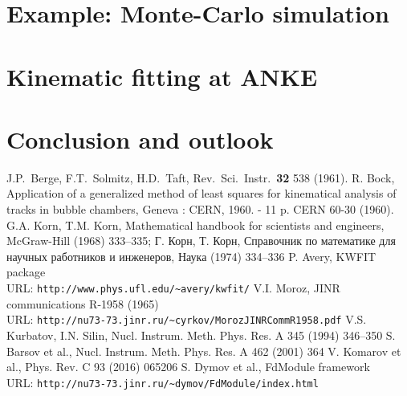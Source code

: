 \documentclass{webofc}
\begin{document}
\section{Example: Monte-Carlo simulation}

\section{Kinematic fitting at ANKE}

\section{Conclusion and outlook}


\begin{thebibliography}{00}
 J.P.~Berge, F.T.~Solmitz, H.D.~Taft, Rev.\ Sci.\ Instr.\ \textbf{32} 538 (1961).
 R. Bock, Application of a generalized method of least squares for kinematical analysis of tracks in bubble chambers,       Geneva : CERN, 1960. - 11 p. CERN 60-30 (1960).
 G.A. Korn, T.M. Korn, Mathematical handbook for scientists and engineers, McGraw-Hill (1968) 333--335; \foreignlanguage{russian}{Г. Корн, Т. Корн, Справочник по математике для научных работников и инженеров, Наука (1974) 334--336}
 P. Avery, KWFIT package\\ URL: \texttt{http://www.phys.ufl.edu/\textasciitilde{}avery/kwfit/}
 V.I. Moroz, JINR communications R-1958 (1965)\\ URL: \texttt{http://nu73-73.jinr.ru/\textasciitilde{}cyrkov/MorozJINRCommR1958.pdf}
 V.S. Kurbatov, I.N. Silin, Nucl. Instrum. Meth. Phys. Res. A 345 (1994) 346--350
 S. Barsov et al., Nucl. Instrum. Meth. Phys. Res. A 462 (2001) 364
 V. Komarov et al., Phys. Rev. C 93 (2016) 065206
 S. Dymov et al., FdModule framework\\ URL: \texttt{http://nu73-73.jinr.ru/\textasciitilde{}dymov/FdModule/index.html}


\end{thebibliography}
\end{document}
